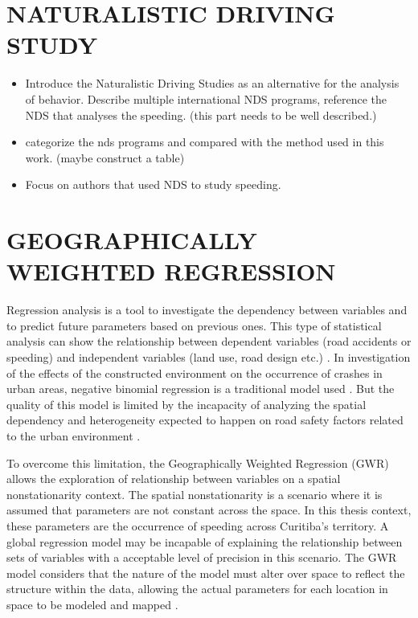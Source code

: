 \section{NATURALISTIC DRIVING STUDY}

\begin{itemize}
    \item Introduce the Naturalistic Driving Studies as an alternative for the analysis of behavior. Describe multiple international NDS programs, reference the NDS that analyses the speeding. (this part needs to be well described.)
    \item categorize the nds programs and compared with the method used in this work. (maybe construct a table)
    \item Focus on authors that used NDS to study speeding. 
\end{itemize}

\section{GEOGRAPHICALLY WEIGHTED REGRESSION}

Regression analysis is a tool to investigate the dependency between variables and to predict future parameters based on previous ones. This type of statistical analysis can show the relationship between dependent variables (road accidents or speeding) and independent variables (land use, road design etc.) \cite{Lindley1987}. In investigation of the effects of the constructed environment on the occurrence of crashes in urban areas, negative binomial regression is a traditional model used \cite{Wei2013, Zhang2014}. But the quality of this model is limited by the incapacity of analyzing the spatial dependency and heterogeneity expected to happen on road safety factors related to the urban environment \cite{Obelheiro2019}.


To overcome this limitation, the Geographically Weighted Regression (GWR) allows the exploration of relationship between variables on a spatial nonstationarity context. The spatial nonstationarity is a scenario where it is assumed that parameters are not constant across the space. In this thesis context, these parameters are the occurrence of speeding across Curitiba's territory. A global regression model may be incapable of explaining the relationship between sets of variables with a acceptable level of precision in this scenario. The GWR model considers that the nature of the model must alter over space to reflect the structure within the data, allowing the actual parameters for each location in space to be modeled and mapped \cite{Brunsdon2010}.

